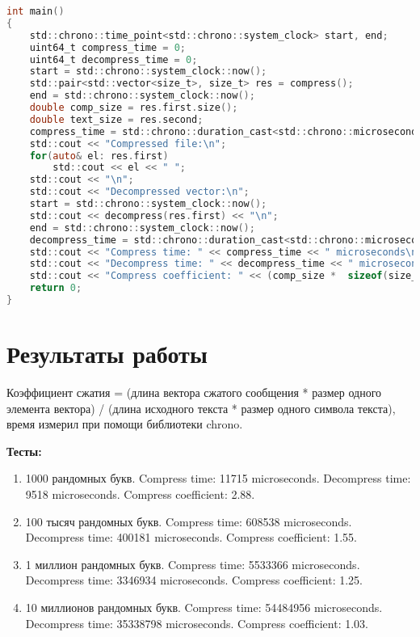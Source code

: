 \begin{lstlisting}[language=C]
int main()
{
    std::chrono::time_point<std::chrono::system_clock> start, end;
    uint64_t compress_time = 0;
    uint64_t decompress_time = 0;
    start = std::chrono::system_clock::now();
    std::pair<std::vector<size_t>, size_t> res = compress();
    end = std::chrono::system_clock::now();
    double comp_size = res.first.size();
    double text_size = res.second;
    compress_time = std::chrono::duration_cast<std::chrono::microseconds>(end - start).count();
    std::cout << "Compressed file:\n";
    for(auto& el: res.first)
        std::cout << el << " ";
    std::cout << "\n";
    std::cout << "Decompressed vector:\n";
    start = std::chrono::system_clock::now();
    std::cout << decompress(res.first) << "\n";
    end = std::chrono::system_clock::now();
    decompress_time = std::chrono::duration_cast<std::chrono::microseconds>(end - start).count();
    std::cout << "Compress time: " << compress_time << " microseconds\n";
    std::cout << "Decompress time: " << decompress_time << " microseconds\n";
    std::cout << "Compress coefficient: " << (comp_size *  sizeof(size_t)) / (text_size * sizeof(char)) << "\n";
    return 0;
}


\end{lstlisting}

\pagebreak

\section{Результаты работы}
Коэффициент сжатия = (длина вектора сжатого сообщения * размер одного элемента вектора) / (длина исходного текста * размер одного символа текста), время измерил при помощи библиотеки chrono.

\textbf{Тесты:}
\begin{enumerate}
\item 1000 рандомных букв. Compress time: 11715 microseconds. Decompress time: 9518 microseconds. Compress coefficient: 2.88.
\item 100 тысяч рандомных букв. Compress time: 608538 microseconds. Decompress time: 400181 microseconds. Compress coefficient: 1.55.
\item 1 миллион рандомных букв. Compress time: 5533366 microseconds. Decompress time: 3346934 microseconds. Compress coefficient: 1.25.
\item 10 миллионов рандомных букв. Compress time: 54484956 microseconds. Decompress time: 35338798 microseconds. Compress coefficient: 1.03.
\end{enumerate}

\pagebreak